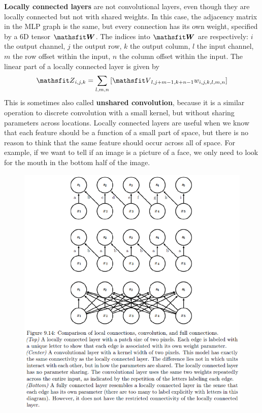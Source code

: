 \begin{multicols}{2}
	\textbf{Locally connected layers}  are not convolutional layers, even though they are locally connected but not with shared weights.
	In this case, the adjacency matrix in the MLP graph is the same, but every connection has its own weight, specified by a 6D tensor $\tW$.
	The indices into $\tW$ are respectively:
	$i$ the output channel, $j$ the output row, $k$ the output column, $l$ the input channel, $m$ the row offset within the input, $n$ the column offset within the input.
	The linear part of a locally connected layer is given by
	\[ \etZ_{i,j,k} = \sum_{l,m,n} \left[ \etV_{l,j+m-1,k+n-1} w_{i,j,k,l,m,n} \right] \]
	This is sometimes also called \textbf{unshared convolution}, because it is a similar operation to discrete convolution with a small kernel, but without sharing parameters across locations.
	Locally connected layers are useful when we know that each feature should be a function of a small part of space, but there is no reason to think that the same feature should occur across all of space.
	For example, if we want to tell if an image is a picture of a face, we only need to look for the mouth in the bottom half of the image.
	\begin{figure}[H]
		\centering
		\includegraphics[width=0.8\linewidth]{images/locallyConn.png}
	\end{figure}
	\newpage

\end{multicols}
